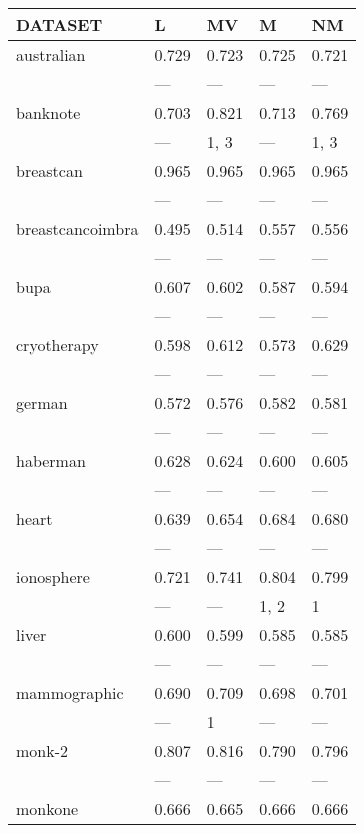 \begin{tabular}{lllll}
\toprule
 DATASET          & L     & MV    & M     & NM    \\
\midrule
 australian       & 0.729 & 0.723 & 0.725 & 0.721 \\
                  & ---   & ---   & ---   & ---   \\
 banknote         & 0.703 & 0.821 & 0.713 & 0.769 \\
                  & ---   & 1, 3  & ---   & 1, 3  \\
 breastcan        & 0.965 & 0.965 & 0.965 & 0.965 \\
                  & ---   & ---   & ---   & ---   \\
 breastcancoimbra & 0.495 & 0.514 & 0.557 & 0.556 \\
                  & ---   & ---   & ---   & ---   \\
 bupa             & 0.607 & 0.602 & 0.587 & 0.594 \\
                  & ---   & ---   & ---   & ---   \\
 cryotherapy      & 0.598 & 0.612 & 0.573 & 0.629 \\
                  & ---   & ---   & ---   & ---   \\
 german           & 0.572 & 0.576 & 0.582 & 0.581 \\
                  & ---   & ---   & ---   & ---   \\
 haberman         & 0.628 & 0.624 & 0.600 & 0.605 \\
                  & ---   & ---   & ---   & ---   \\
 heart            & 0.639 & 0.654 & 0.684 & 0.680 \\
                  & ---   & ---   & ---   & ---   \\
 ionosphere       & 0.721 & 0.741 & 0.804 & 0.799 \\
                  & ---   & ---   & 1, 2  & 1     \\
 liver            & 0.600 & 0.599 & 0.585 & 0.585 \\
                  & ---   & ---   & ---   & ---   \\
 mammographic     & 0.690 & 0.709 & 0.698 & 0.701 \\
                  & ---   & 1     & ---   & ---   \\
 monk-2           & 0.807 & 0.816 & 0.790 & 0.796 \\
                  & ---   & ---   & ---   & ---   \\
 monkone          & 0.666 & 0.665 & 0.666 & 0.666 \\

\end{tabular}
